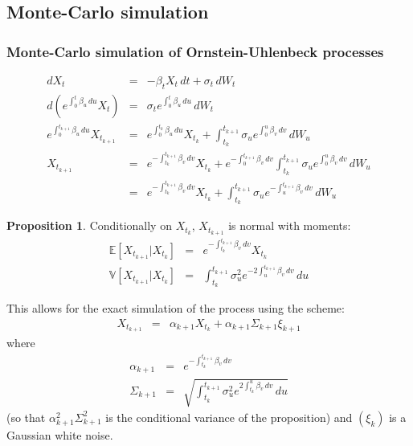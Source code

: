 \documentclass[11pt,english]{amsart}
\newcommand{\EE}{\mathbb{E}}
\newcommand{\VV}{\mathbb{V}}
\theoremstyle{definition}
\newtheorem{prop}{Proposition}
\begin{document}
\subsection{Monte-Carlo simulation} 

\subsubsection{Monte-Carlo simulation of Ornstein-Uhlenbeck processes} 


\begin{eqnarray*}
  dX_{t}  &=& - \beta_t X_t \, dt + \sigma_t  \, dW_t \\
  d\left( e^{\int_0^t\beta_u\,du }X_{t} \right) &=&  \sigma_t e^{\int_0^t\beta_u\,du } \, dW_t \\
  e^{\int_0^{t_{k+1}}\beta_u\,du }X_{t_{k+1}}  &=&  e^{\int_0^{t_k}\beta_u\,du }X_{t_{k}} + \int_{t_{k}}^{t_{k+1}} \sigma_u e^{\int_0^u\beta_v\,dv } \, dW_u \\
  X_{t_{k+1}}  &=&  e^{-\int_{t_{k}}^{t_{k+1}}\beta_v\,dv }X_{t_k} + e^{-\int_0^{t_{k+1}}\beta_v\,dv } \int_{t_{k}}^{t_{k+1}} \sigma_u e^{\int_0^u\beta_v\,dv } \, dW_u \\
   &=&  e^{-\int_{t_{k}}^{t_{k+1}}\beta_v\,dv }X_{t_k} + \int_{t_{k}}^{t_{k+1}} \sigma_u e^{-\int_{u}^{t_{k+1}}\beta_v\,dv } \, dW_u 
\end{eqnarray*}

\begin{prop}
Conditionally on $X_{t_k}$, $X_{t_{k+1}}$ is normal with moments:
\begin{eqnarray}
  \EE[X_{t_{k+1}} | X_{t_k}] &=& e^{-\int_{t_k}^{t_{k+1}}\beta_v\,dv }  X_{t_k}  \\
  \VV[X_{t_{k+1}} | X_{t_k}] &=& \int_{t_{k}}^{t_{k+1}} \sigma_u^2 e^{-2\int_u^{t_{k+1}}\beta_v\,dv } \, du
\end{eqnarray} 
\end{prop}

This allows for the exact simulation of the process using the scheme: 
\begin{eqnarray*}
  X_{t_{k+1}}  &=&   \alpha_{k+1} X_{t_k} + \alpha_{k+1} \Sigma_{k+1} \xi_{k+1}
\end{eqnarray*}
where 
\begin{eqnarray*}
  \alpha_{k+1} &=& e^{-\int_{t_k}^{t_{k+1}}\beta_v\,dv }  \\
  \Sigma_{k+1} &=& \sqrt{ \int_{t_k}^{t_{k+1}} \sigma_u^2 e^{2\int_{t_k}^u\beta_v\,dv } \, du} 
\end{eqnarray*}
(so that $\alpha_{k+1}^2\Sigma_{k+1}^2$ is the conditional variance of the proposition) and $(\xi_k)$ is a Gaussian white noise. 
\end{document}
